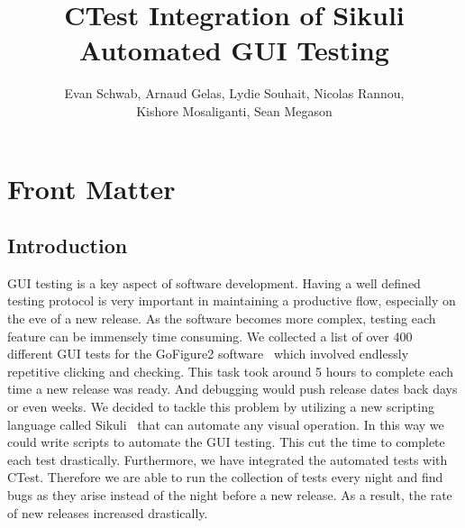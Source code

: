 \documentclass{InsightArticle}
\title{CTest Integration of Sikuli Automated GUI Testing}
\author{Evan Schwab, Arnaud Gelas, Lydie Souhait, Nicolas Rannou,\\
Kishore Mosaliganti, Sean Megason}
\newcommand{\IJhandlerIDnumber}{3196}
\begin{document}
\IJhandlefooter{\IJhandlerIDnumber}


\ifpdf
\else
\fi

\maketitle

\ifhtml
\chapter*{Front Matter\label{front}}
\fi

\begin{abstract}
\noindent
 
\end{abstract}

\IJhandlenote{\IJhandlerIDnumber}

\tableofcontents
\section{Introduction}


GUI testing is a key aspect of software development. Having a well defined
testing protocol is very important in maintaining a productive flow, especially
on the eve of a new release. As the software becomes more complex, testing each
feature can be immensely time consuming. We collected a list of over 400
different GUI tests for the GoFigure2 software~\cite{GoFigure2:Website} which
involved endlessly repetitive clicking and checking. This task took around 5
hours to complete each time a new release was ready. And debugging would push
release dates back days or even weeks. We decided to tackle this problem by
utilizing a new scripting language called
Sikuli~\cite{Sikuli:Documentation,Sikuli:Website,Yeh:2009:Sikuli} that can
automate any visual operation. In this way we could write scripts to automate
the GUI testing. This cut the time to complete each test drastically.
Furthermore, we have integrated the automated tests with CTest. Therefore we
are able to run the collection of tests every night and find bugs as they
arise instead of the night before a new release. As a result, the rate of new
releases increased drastically.\\
\end{document}
